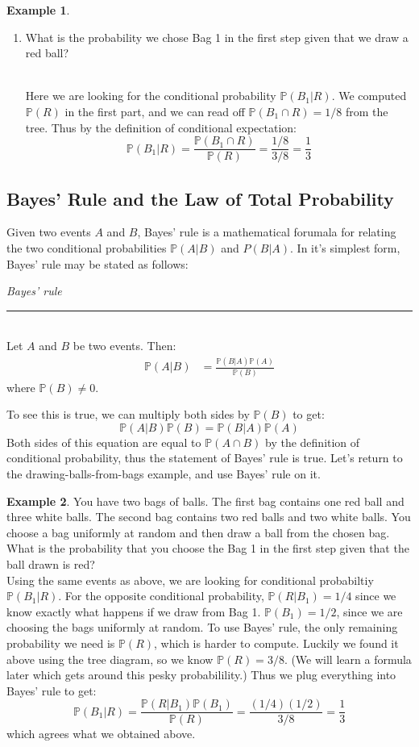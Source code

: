\documentclass[12pt]{article}
\theoremstyle{definition}
\newtheorem*{example}{Example}
\theoremstyle{remark}
\def\P{{\mathbb P}}
\begin{document}
\begin{example}
\begin{enumerate}
\item What is the probability we chose Bag 1 in the first step given that we draw a red ball?\\\

Here we are looking for the conditional probability $\P(B_1|R)$. We computed $\P(R)$ in the first part, and we can read off $\P(B_1 \cap R) = 1/8$ from the tree. Thus by the definition of conditional expectation:
\[
\P(B_1|R) = \frac{\P(B_1 \cap R)}{\P(R)} = \frac{1/8}{3/8} = \frac{1}{3}
\]
\end{enumerate}
\end{example}

\subsection{Bayes' Rule and the Law of Total Probability}
Given two events $A$ and $B$, Bayes' rule is a mathematical forumala for relating the two conditional probabilities $\P(A|B)$ and $P(B|A)$. In it's simplest form, Bayes' rule may be stated as follows:

\begin{framed}
\emph{Bayes' rule}\\
  \rule{\dimexpr{}\fboxrule}{.1pt} \\
Let $A$ and $B$ be two events. Then:
\begin{align*}
\P(A | B) &= \frac{ \P(B|A)\P(A)}{\P(B)}
\end{align*}
where $\P(B) \neq 0.$
\end{framed}
To see this is true, we can multiply both sides by $\P(B)$ to get:
\[
\P(A|B) \P(B) = \P(B|A)\P(A)
\]
Both sides of this equation are equal to $\P(A\cap B)$ by the definition of conditional probability, thus the statement of Bayes' rule is true. Let's return to the drawing-balls-from-bags example, and use Bayes' rule on it.

\begin{example}You have two bags of balls. The first bag contains one red ball and three white balls. The second bag contains two red balls and two white balls. You choose a bag uniformly at random and then draw a ball from the chosen bag. What is the probability that you choose the Bag 1 in the first step given that the ball drawn is red?\\

Using the same events as above, we are looking for conditional probabiltiy $\P(B_1|R)$. For the opposite conditional probability, $\P(R | B_1) = 1/4$ since we know exactly what happens if we draw from Bag 1. $\P(B_1) = 1/2$, since we are choosing the bags uniformly at random. To use Bayes' rule, the only remaining probability we need is $\P(R)$, which is harder to compute. Luckily we found it above using the tree diagram, so we know $\P(R) = 3/8$. (We will learn a formula later which gets around this pesky probabilility.) Thus we plug everything into Bayes' rule to get:
\[
\P(B_1| R) = \frac{ \P(R|B_1)\P(B_1)}{\P(R)} = \frac{ (1/4)(1/2) }{3/8} = \frac{1}{3}
\]
which agrees what we obtained above.
\end{example}
\end{document}
